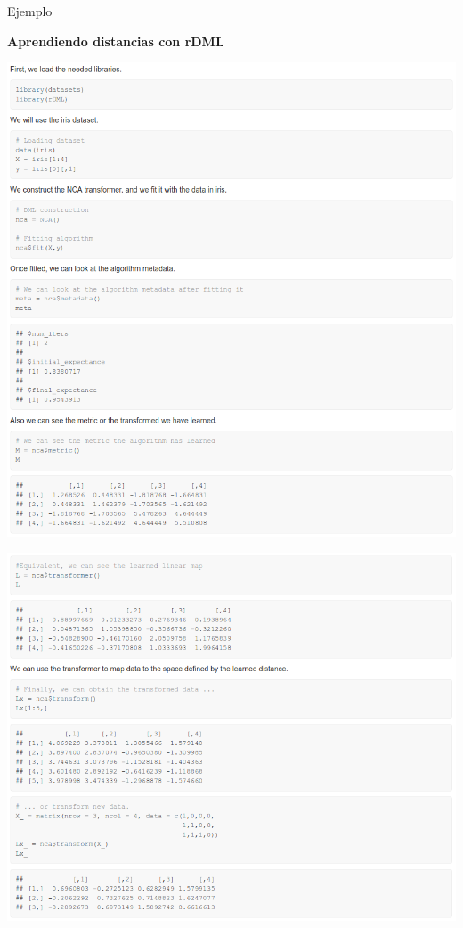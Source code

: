 \documentclass[10pt, compress]{beamer}
\begin{document}
\begin{frame}{Ejemplo}
  \begin{center}\textbf{Aprendiendo distancias con rDML}\end{center}
  \begin{minipage}[t]{0.48\textwidth}
      \centering\includegraphics[width=\textwidth]{images/ex_rdml_1.png}
  \end{minipage}
  \hfill
  \begin{minipage}[t]{0.48\textwidth}
      \centering\includegraphics[width=\textwidth]{images/ex_rdml_2.png}
  \end{minipage}
\end{frame}
\end{document}
